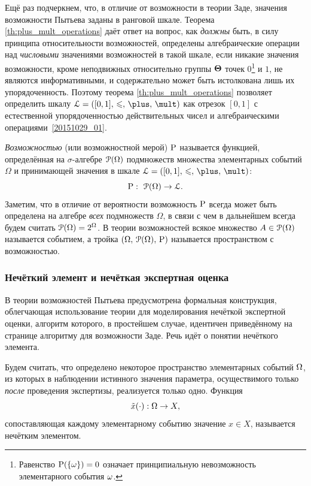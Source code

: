 Ещё раз подчеркнем, что, в отличие от возможности в теории Заде, значения возможности Пытьева заданы в ранговой шкале. Теорема \ref{th:plus_mult_operations} даёт ответ на вопрос, как \emph{должны} быть, в силу принципа относительности возможностей, определены алгебраические операции над \emph{числовыми} значениями возможностей в такой шкале, если никакие значения возможности, кроме неподвижных относительно группы $\bTheta$ точек $0$\footnote{Равенство $\P(\{\om\}) = 0$ означает принципиальную невозможность элементарного события $\om$.} и $1$, не являются информативными, и содержательно может быть истолкована лишь их упорядоченность. Поэтому теорема \ref{th:plus_mult_operations} позволяет определить шкалу $\scL=\scale$ как отрезок $[0,1]$ с естественной упорядоченностью действительных чисел и алгебраическими операциями~\eqref{20151029_01}.

\emph{Возможностью} (или возможностной мерой) $\P$ называется функцией, определённая на $\sigma$-алгебре $\Po(\Omega)$ подмножеств множества элементарных событий $\Omega$ и принимающей значения в шкале $\scL=\scale$:
\begin{equation*}
    \P:\ \Po(\Omega)\to\scL.
\end{equation*}
Заметим, что в отличие от вероятности возможность $\P$ всегда может быть определена на алгебре \emph{всех} подмножеств $\Omega$, в связи с чем в дальнейшем всегда будем считать $\Po(\Omega) = 2^\Omega$. В теории возможностей всякое множество $A\in\Po(\Omega)$ называется событием, а тройка $\OAP$ называется пространством с возможностью. 

\subsubsection{Нечёткий элемент и нечёткая экспертная оценка}

В теории возможностей Пытьева предусмотрена формальная конструкция, облегчающая использование теории для моделирования нечёткой экспертной оценки, алгоритм которого, в простейшем случае, идентичен приведённому на странице \pageref{zadeh_fuzzy_asset_alg} алгоритму для возможности Заде. Речь идёт о понятии нечёткого элемента.

Будем считать, что определено некоторое пространство элементарных событий $\Om$, из которых в наблюдении истинного значения параметра, осуществимого только \emph{после} проведения экспертизы, реализуется только одно. Функция
\begin{equation*}
	\tilde x(\cdot): \Om \rightarrow X,
\end{equation*} 
сопоставляющая каждому элементарному событию значение $x \in X$, называется нечётким элементом.  

